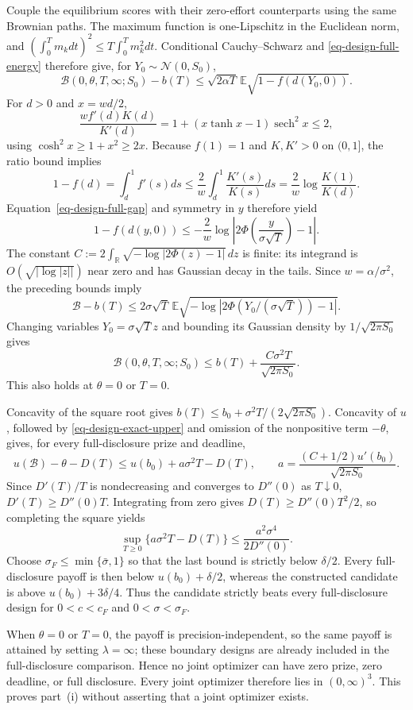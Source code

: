 \documentclass[mnsc]{informs3}
\begin{document}
\begin{APPENDICES}
{Couple the equilibrium scores with their zero-effort counterparts using
the same Brownian paths. The maximum function is one-Lipschitz in the
Euclidean norm, and
$(\int_0^Tm_kdt)^2\leq T\int_0^Tm_k^2dt$. Conditional
Cauchy--Schwarz and \eqref{eq-design-full-energy} therefore give, for
$Y_0\sim\mathcal N(0,S_0)$,
\[
\mathcal B(0,\theta,T,\infty;S_0)-b(T)
\leq\sqrt{2\alpha T}\,
\mathbb E\sqrt{1-f(d(Y_0,0))}.
\]
For $d>0$ and $x=wd/2$,
\[
\frac{wf'(d)K(d)}{K'(d)}
=1+(x\tanh x-1)\operatorname{sech}^2x\leq2,
\]
using $\cosh^2x\geq1+x^2\geq2x$.
Because $f(1)=1$ and $K,K'>0$ on $(0,1]$, the ratio bound implies
\[
1-f(d)=\int_d^1f'(s)ds
\leq\frac2w\int_d^1\frac{K'(s)}{K(s)}ds
=\frac2w\log\frac{K(1)}{K(d)}.
\]
Equation~\eqref{eq-design-full-gap} and symmetry in $y$ therefore yield
\[
1-f(d(y,0))\leq-\frac2w
\log\left|2\Phi\!\left(\frac{y}{\sigma\sqrt T}\right)-1\right|.
\]
The constant $C:=2\int_{\mathbb R}\sqrt{-\log|2\Phi(z)-1|}\,dz$
is finite: its integrand is $O(\sqrt{|\log|z||})$ near zero and
has Gaussian decay in the tails. Since $w=\alpha/\sigma^2$, the preceding
bounds imply
\[
\mathcal B-b(T)
\leq2\sigma\sqrt T\,
\mathbb E\sqrt{-\log|2\Phi(Y_0/(\sigma\sqrt T))-1|}.
\]
Changing variables $Y_0=\sigma\sqrt Tz$ and bounding its Gaussian
density by $1/\sqrt{2\pi S_0}$ gives
\begin{equation}\label{eq-design-exact-upper}
\mathcal B(0,\theta,T,\infty;S_0)
\leq b(T)+\frac{C\sigma^2T}{\sqrt{2\pi S_0}}.
\end{equation}
This also holds at $\theta=0$ or $T=0$.

Concavity of the square root gives
$b(T)\leq b_0+\sigma^2T/(2\sqrt{2\pi S_0})$. Concavity of $u$, followed
by \eqref{eq-design-exact-upper} and omission of the nonpositive term
$-\theta$, gives, for every full-disclosure prize and deadline,
\[
u(\mathcal B)-\theta-D(T)
\leq u(b_0)+a\sigma^2T-D(T),\qquad
a=\frac{(C+1/2)u'(b_0)}{\sqrt{2\pi S_0}}.
\]
Since $D'(T)/T$ is nondecreasing and converges to $D''(0)$ as
$T\downarrow0$, $D'(T)\geq D''(0)T$. Integrating from zero gives
$D(T)\geq D''(0)T^2/2$, so completing the square yields
\[
\sup_{T\geq0}\{a\sigma^2T-D(T)\}
\leq\frac{a^2\sigma^4}{2D''(0)}.
\]
Choose $\sigma_F\leq\min\{\bar\sigma,1\}$ so that the last bound is
strictly below $\delta/2$. Every full-disclosure payoff is then below
$u(b_0)+\delta/2$, whereas the constructed candidate is above
$u(b_0)+3\delta/4$. Thus the candidate strictly beats every
full-disclosure design for $0<c<c_F$ and $0<\sigma<\sigma_F$.

When $\theta=0$ or $T=0$, the payoff is precision-independent, so the
same payoff is attained by setting $\lambda=\infty$; these boundary
designs are already included in the full-disclosure comparison. Hence no
joint optimizer can have zero prize, zero deadline, or full disclosure.
Every joint optimizer therefore lies in $(0,\infty)^3$. This proves
part~(i) without asserting that a joint optimizer exists.


}
\end{APPENDICES}
\end{document}
